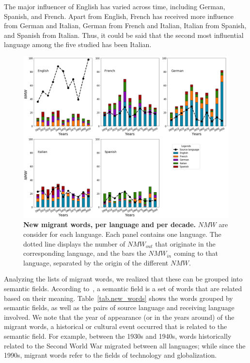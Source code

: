 \documentclass[10pt,letterpaper]{article} %
\begin{document}
The major influencer of English has varied across time, including German, Spanish, and French. Apart from English, French has received more influence from German and Italian, German from French and Italian, Italian from Spanish, and Spanish from Italian. Thus, it could be said that the second most influential language among the five studied has been Italian. 


\begin{figure} %
\begin{adjustwidth}{-1.2in}{0in}
\includegraphics[scale=.35]{NW_A_ejes.png}
\caption{{\bf New migrant words, per language and per decade.} 
$NMW$ are consider for each language. Each panel contains one language. 
The dotted line displays the number of $NMW_{out}$ that originate in the 
corresponding language, and the bars the $NMW_{in}$ coming to that language, 
separated by the origin of the different $NMW$. }
% 
\label{fig.NMW_A}
\end{adjustwidth}
\end{figure} %
	
Analyzing the lists  of 
migrant words, we realized that
these can be grouped into semantic fields. According to~\cite{semantic_oxford},
a semantic field is a set of words that are related based on their meaning.
Table~\ref{tab.new_words} shows the words grouped by semantic fields, as well as
the pairs of source language and receiving language involved. We note that the
year of appearance (or in the years around) of the migrant words, a historical
or cultural event occurred that is related to the semantic field. For example,
between the 1930s and 1940s, words historically related to the Second World War
migrated between all languages; while since the 1990s, migrant words refer
to the fields of technology and globalization.  
\end{document}
